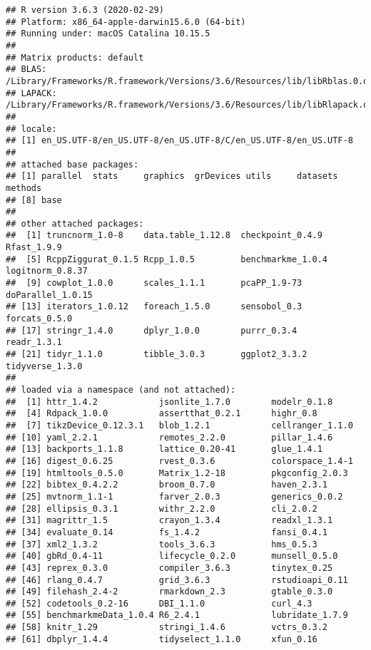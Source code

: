 \documentclass[11pt,]{article}
\begin{document}
\begin{verbatim}
## R version 3.6.3 (2020-02-29)
## Platform: x86_64-apple-darwin15.6.0 (64-bit)
## Running under: macOS Catalina 10.15.5
## 
## Matrix products: default
## BLAS:   /Library/Frameworks/R.framework/Versions/3.6/Resources/lib/libRblas.0.dylib
## LAPACK: /Library/Frameworks/R.framework/Versions/3.6/Resources/lib/libRlapack.dylib
## 
## locale:
## [1] en_US.UTF-8/en_US.UTF-8/en_US.UTF-8/C/en_US.UTF-8/en_US.UTF-8
## 
## attached base packages:
## [1] parallel  stats     graphics  grDevices utils     datasets  methods  
## [8] base     
## 
## other attached packages:
##  [1] truncnorm_1.0-8    data.table_1.12.8  checkpoint_0.4.9   Rfast_1.9.9       
##  [5] RcppZiggurat_0.1.5 Rcpp_1.0.5         benchmarkme_1.0.4  logitnorm_0.8.37  
##  [9] cowplot_1.0.0      scales_1.1.1       pcaPP_1.9-73       doParallel_1.0.15 
## [13] iterators_1.0.12   foreach_1.5.0      sensobol_0.3       forcats_0.5.0     
## [17] stringr_1.4.0      dplyr_1.0.0        purrr_0.3.4        readr_1.3.1       
## [21] tidyr_1.1.0        tibble_3.0.3       ggplot2_3.3.2      tidyverse_1.3.0   
## 
## loaded via a namespace (and not attached):
##  [1] httr_1.4.2            jsonlite_1.7.0        modelr_0.1.8         
##  [4] Rdpack_1.0.0          assertthat_0.2.1      highr_0.8            
##  [7] tikzDevice_0.12.3.1   blob_1.2.1            cellranger_1.1.0     
## [10] yaml_2.2.1            remotes_2.2.0         pillar_1.4.6         
## [13] backports_1.1.8       lattice_0.20-41       glue_1.4.1           
## [16] digest_0.6.25         rvest_0.3.6           colorspace_1.4-1     
## [19] htmltools_0.5.0       Matrix_1.2-18         pkgconfig_2.0.3      
## [22] bibtex_0.4.2.2        broom_0.7.0           haven_2.3.1          
## [25] mvtnorm_1.1-1         farver_2.0.3          generics_0.0.2       
## [28] ellipsis_0.3.1        withr_2.2.0           cli_2.0.2            
## [31] magrittr_1.5          crayon_1.3.4          readxl_1.3.1         
## [34] evaluate_0.14         fs_1.4.2              fansi_0.4.1          
## [37] xml2_1.3.2            tools_3.6.3           hms_0.5.3            
## [40] gbRd_0.4-11           lifecycle_0.2.0       munsell_0.5.0        
## [43] reprex_0.3.0          compiler_3.6.3        tinytex_0.25         
## [46] rlang_0.4.7           grid_3.6.3            rstudioapi_0.11      
## [49] filehash_2.4-2        rmarkdown_2.3         gtable_0.3.0         
## [52] codetools_0.2-16      DBI_1.1.0             curl_4.3             
## [55] benchmarkmeData_1.0.4 R6_2.4.1              lubridate_1.7.9      
## [58] knitr_1.29            stringi_1.4.6         vctrs_0.3.2          
## [61] dbplyr_1.4.4          tidyselect_1.1.0      xfun_0.16
\end{verbatim}
\end{document}
